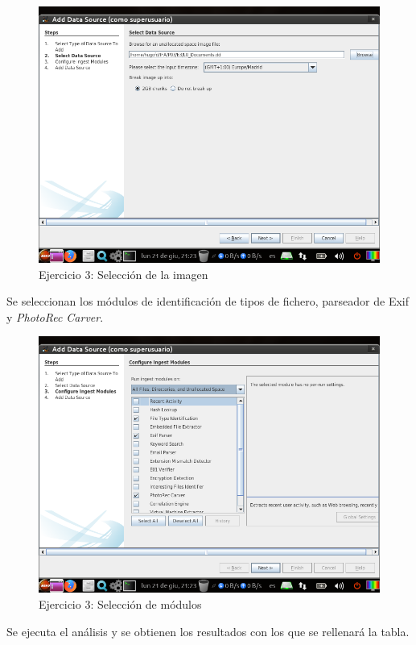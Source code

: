 \documentclass[11pt]{article}
\begin{document}
\begin{figure}[H]
    \caption{Ejercicio 3: Selección de la imagen}
    \centering
    \includegraphics[scale=0.7]{e3-3.png}
\end{figure}

Se seleccionan los módulos de identificación de tipos de fichero, parseador de Exif y \textit{PhotoRec Carver}.

\begin{figure}[H]
    \caption{Ejercicio 3: Selección de módulos}
    \centering
    \includegraphics[scale=0.7]{e3-4.png}
\end{figure}

Se ejecuta el análisis y se obtienen los resultados con los que se rellenará la tabla.
\end{document}
